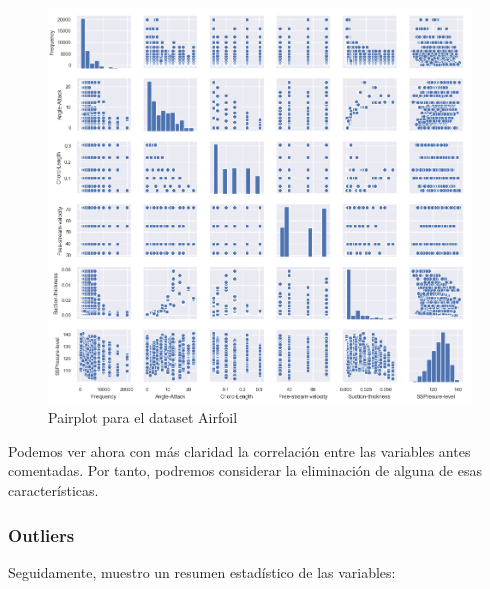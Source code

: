 \begin{figure}[H] %
	\centering
	\includegraphics[scale=0.6]{pairplot-air.png}  %
	\caption{Pairplot para el dataset Airfoil} 
	\label{fig:pairplot-air}
\end{figure}

Podemos ver ahora con más claridad la correlación entre las variables antes comentadas. Por tanto, podremos considerar la eliminación de alguna de esas características.

\subsubsection{Outliers}

Seguidamente, muestro un resumen estadístico de las variables:


